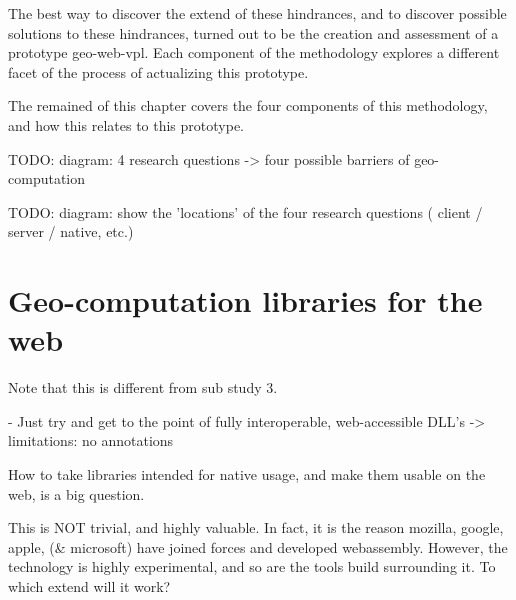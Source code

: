 The best way to discover the extend of these hindrances, and to discover possible solutions to these hindrances, turned out to be the creation and assessment of a prototype \ac{geo-web-vpl}. Each component of the methodology explores a different facet of the process of actualizing this prototype.

The remained of this chapter covers the four components of this methodology, and how this relates to this prototype. 

\begin{note}
TODO: diagram: 4 research questions -> four possible barriers of geo-computation
\end{note}

\begin{note}
TODO: diagram: show the 'locations' of the four research questions ( client / server / native, etc.)
\end{note}


\section{Geo-computation libraries for the web}
\label{sec:method-one}

\begin{note}
  Note that this is different from sub study 3.
 
  - Just try and get to the point of fully interoperable, web-accessible DLL's
    -> limitations: no annotations 

\end{note}
\mySubRQOne

How to take libraries intended for native usage, and make them usable on the web, is a big question. 

This is NOT trivial, and highly valuable.  In fact, it is the reason mozilla, google, apple, (\& microsoft) have joined forces and developed webassembly. However, the technology is highly experimental, and so are the tools build surrounding it. To which extend will it work?


